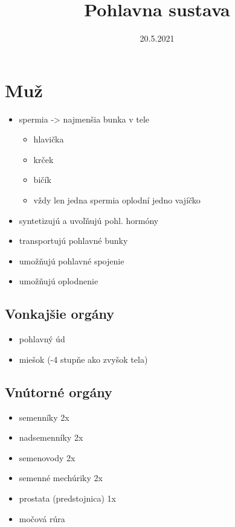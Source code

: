 \documentclass[
]{article}
\title{Pohlavna sustava}
\author{}
\date{\vspace{-2.5em}20.5.2021}
\providecommand{\tightlist}{%
  \setlength{\itemsep}{0pt}\setlength{\parskip}{0pt}}
\begin{document}
\maketitle

\hypertarget{muux17e}{%
\section{Muž}\label{muux17e}}

\begin{itemize}
\tightlist
\item
  spermia -\textgreater{} najmenšia bunka v tele

  \begin{itemize}
  \tightlist
  \item
    hlavička
  \item
    krček
  \item
    bičík
  \item
    vždy len jedna spermia oplodní jedno vajíčko
  \end{itemize}
\item
  syntetizujú a uvoľňujú pohl. hormóny
\item
  transportujú pohlavné bunky
\item
  umožňujú pohlavné spojenie
\item
  umožňujú oplodnenie
\end{itemize}

\hypertarget{vonkajux161ie-orguxe1ny}{%
\subsection{Vonkajšie orgány}\label{vonkajux161ie-orguxe1ny}}

\begin{itemize}
\tightlist
\item
  pohlavný úd
\item
  miešok (-4 stupňe ako zvyšok tela)
\end{itemize}

\hypertarget{vnuxfatornuxe9-orguxe1ny}{%
\subsection{Vnútorné orgány}\label{vnuxfatornuxe9-orguxe1ny}}

\begin{itemize}
\tightlist
\item
  semenníky 2x
\item
  nadsemenníky 2x
\item
  semenovody 2x
\item
  semenné mechúriky 2x
\item
  prostata (predstojnica) 1x
\item
  močová rúra
\end{itemize}
\end{document}
